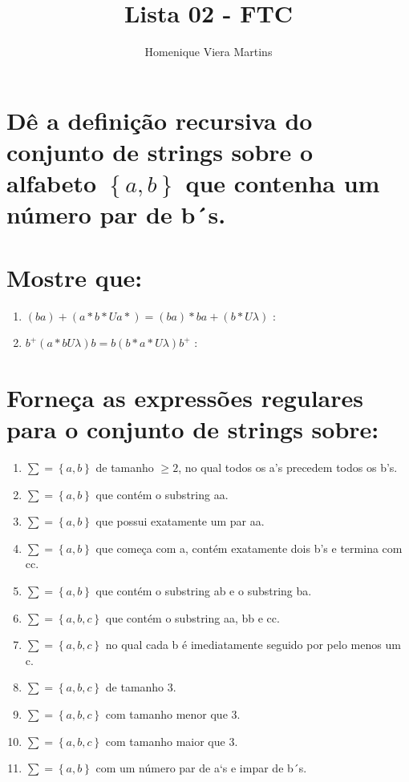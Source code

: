 \documentclass[10pt,a4paper,landscape]{article}
\author{Homenique Viera Martins}
\title{Lista 02 - FTC}
\begin{document}
\maketitle{}


\section{Dê a definição recursiva do conjunto de strings sobre o alfabeto \(\left\{  a, b  \right\}\) que contenha um número par de b´s.}


\section{Mostre que: }
    \begin{enumerate}[label=\Alph*]
        \item \((ba) + (a*b* U a*) = (ba)* ba+ (b* U \lambda)\) :
        \item \(b^+(a*b U \lambda )b = b(b*a* U \lambda) b^+ \) :
    \end{enumerate} 

\section{Forneça as expressões regulares para o conjunto de strings sobre:}
\begin{enumerate}[label=\Alph*]
    \item \(\sum = \left\{  a, b  \right\}\) de tamanho \(\ge 2\), no qual todos os a’s precedem todos os b’s.
    \item \(\sum = \left\{  a, b  \right\}\) que contém o substring aa.
    \item \(\sum = \left\{  a, b  \right\}\) que possui exatamente um par  aa.
    \item \(\sum = \left\{  a, b  \right\}\) que começa com a, contém exatamente dois b’s e termina com cc.
    \item \(\sum = \left\{  a, b  \right\}\) que contém o substring  ab  e  o substring ba.
    \item \(\sum = \left\{  a, b, c  \right\}\) que contém o substring aa, bb e cc.
    \item \(\sum = \left\{  a, b, c  \right\}\) no qual cada b é imediatamente seguido por pelo menos um c.
    \item \(\sum = \left\{  a, b, c  \right\}\) de tamanho 3.
    \item \(\sum = \left\{  a, b, c  \right\}\) com tamanho menor que 3.
    \item \(\sum = \left\{  a, b, c  \right\}\) com tamanho maior que 3.
    \item \(\sum = \left\{  a, b  \right\}\) com um número par de a`s e impar de b´s.
\end{enumerate} 
\end{document}
